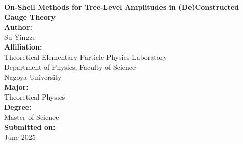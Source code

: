 \documentclass[12pt]{article}
\numberwithin{equation}{section}
\begin{document}
\begin{titlepage}
    \centering
    \vspace*{2cm}

    {\LARGE \textbf{On-Shell Methods for Tree-Level Amplitudes in (De)Constructed Gauge Theory}}\\[1.5cm]

    \textbf{Author:} \\
    {\Large Su Yingze} \\[1cm]

    \textbf{Affiliation:} \\
    Theoretical Elementary Particle Physics Laboratory\\
    Department of Physics, Faculty of Science \\
    Nagoya University \\[1cm]

    \textbf{Major:} \\
    Theoretical Physics \\[1cm]

    \textbf{Degree:} \\
    Master of Science \\[1cm]

    \textbf{Submitted on:} \\
    June 2025 \\[2cm]

    \vfill
\end{titlepage}
\newpage
\end{document}
